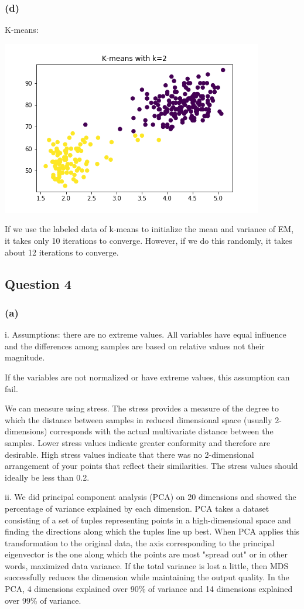 \documentclass[12pt]{article}
\begin{document}
{\subsubsection*{(d)}
K-means:
\begin{center}
\includegraphics[scale=0.8]{P3/k_means.png}
\end{center}

If we use the labeled data of k-means to initialize the mean and variance of EM, it takes only 10 iterations to converge. However, if we do this randomly, it takes about 12 iterations to converge. 

\subsection*{Question 4}
\subsubsection*{(a)}
i.
Assumptions: there are no extreme values. All variables have equal influence and the differences among samples are based on relative values not their magnitude.

If the variables are not normalized or have extreme values, this assumption can fail.

We can measure using stress. The stress provides a measure of the degree to which the distance between samples in reduced dimensional space (usually 2-dimensions) corresponds with the actual multivariate distance between the samples. Lower stress values indicate greater conformity and therefore are desirable. High stress values indicate that there was no 2-dimensional arrangement of your points that reflect their similarities. The stress values should ideally be less than 0.2.

\medskip
ii.
We did principal component analysis (PCA) on 20 dimensions and showed the percentage of variance explained by each dimension. PCA takes a dataset consisting of a set of tuples representing points in a high-dimensional space and finding the directions along which the tuples line up best. When PCA applies this transformation to the original data, the axis corresponding to the principal eigenvector is the one along which the points are most "spread out" or in other words, maximized data variance. If the total variance is lost a little, then MDS successfully reduces the dimension while maintaining the output quality. In the PCA, 4 dimensions explained over 90\% of variance and 14 dimensions explained over 99\% of variance. 

}
\end{document}
